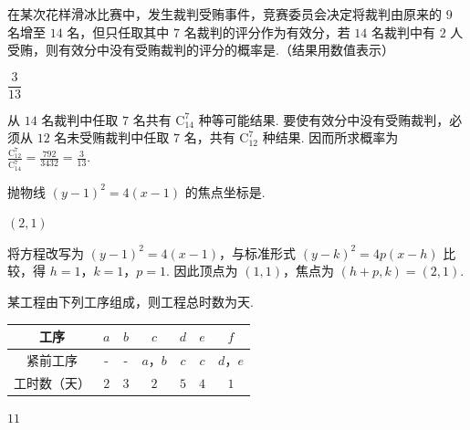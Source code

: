 \begin{problem}
在某次花样滑冰比赛中，发生裁判受贿事件，竞赛委员会决定将裁判由原来的 \(9\) 名增至 \(14\) 名，但只任取其中 \(7\) 名裁判的评分作为有效分，若 \(14\) 名裁判中有 \(2\) 人受贿，则有效分中没有受贿裁判的评分的概率是\fillinblank{}.（结果用数值表示）
\end{problem}

\begin{answer}
\(\dfrac{3}{13}\)
\end{answer}

\begin{solution}
从 \(14\) 名裁判中任取 \(7\) 名共有 \(\mathrm C_{14}^{7}\) 种等可能结果. 要使有效分中没有受贿裁判，必须从 \(12\) 名未受贿裁判中任取 \(7\) 名，共有 \(\mathrm C_{12}^{7}\) 种结果. 因而所求概率为 \(\displaystyle\frac{\mathrm C_{12}^{7}}{\mathrm C_{14}^{7}}=\frac{792}{3432}=\frac{3}{13}\).
\end{solution}

\begin{problem}
抛物线 \((y - 1)^2 = 4(x - 1)\) 的焦点坐标是\fillinblank{}.
\end{problem}

\begin{answer}
\((2,1)\)
\end{answer}

\begin{solution}
将方程改写为 \((y-1)^2=4(x-1)\)，与标准形式 \((y-k)^2=4p(x-h)\) 比较，得 \(h=1\)，\(k=1\)，\(p=1\). 因此顶点为 \((1,1)\)，焦点为 \((h+p,k)=(2,1)\).
\end{solution}

\begin{problem}
某工程由下列工序组成，则工程总时数为\fillinblank{}\(\text{天}\).

\begin{center}
\begin{tabular}{|c|c|c|c|c|c|c|}
\hline
工序 & \(a\) & \(b\) & \(c\) & \(d\) & \(e\) & \(f\) \\
\hline
紧前工序 & - & - & \(a\)，\(b\) & \(c\) & \(c\) & \(d\)，\(e\) \\
\hline
工时数（天） & \(2\) & \(3\) & \(2\) & \(5\) & \(4\) & \(1\) \\
\hline
\end{tabular}
\end{center}
\end{problem}

\begin{answer}
\(11\)
\end{answer}

